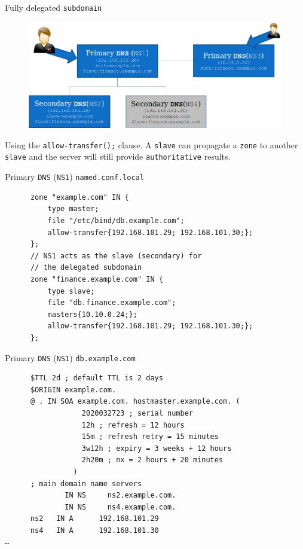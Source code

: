 \documentclass[xcolor=table,aspectratio=169]{beamer}
\begin{document}
\begin{frame}{Fully delegated \texttt{subdomain}}
  \begin{figure}
    \begin{center}
      \includegraphics[width=0.7\linewidth]{FullyDelegated2.png}
    \end{center}
  \end{figure}
  \begin{tcolorbox}
    \begin{center}
      \scriptsize Using the \texttt{allow-transfer();} clause. A \texttt{slave} can propagate a \texttt{zone} to another \texttt{slave} and the server will still provide \texttt{authoritative} results.
    \end{center}
  \end{tcolorbox}
\end{frame}

\begin{frame}[fragile]{Primary \texttt{DNS} (\texttt{NS1}) \texttt{named.conf.local}}
  \begin{tcolorbox}
    \lstset{
      basicstyle=\tiny\ttfamily,
    }
    \begin{lstlisting}
      zone "example.com" IN {
	      type master;
	      file "/etc/bind/db.example.com";
	      allow-transfer{192.168.101.29; 192.168.101.30;};
      };
      // NS1 acts as the slave (secondary) for 
      // the delegated subdomain
      zone "finance.example.com" IN {
	      type slave;
	      file "db.finance.example.com";
	      masters{10.10.0.24;};
	      allow-transfer{192.168.101.29; 192.168.101.30;};
      };    
    \end{lstlisting}
  \end{tcolorbox}
\end{frame}

\begin{frame}[fragile]{Primary \texttt{DNS} (\texttt{NS1}) \texttt{db.example.com}}
  \begin{tcolorbox}
    \lstset{
      basicstyle=\tiny\ttfamily,
    }
    \begin{lstlisting}
      $TTL 2d ; default TTL is 2 days
      $ORIGIN example.com.
      @ . IN SOA example.com. hostmaster.example.com. (
	              2020032723 ; serial number
	              12h ; refresh = 12 hours
	              15m ; refresh retry = 15 minutes
	              3w12h ; expiry = 3 weeks + 12 hours
	              2h20m ; nx = 2 hours + 20 minutes
                )
      ; main domain name servers
	          IN NS 	ns2.example.com.
	          IN NS 	ns4.example.com.
      ns2 	IN A 	  192.168.101.29
      ns4 	IN A 	  192.168.101.30
…
    \end{lstlisting}
  \end{tcolorbox}
\end{frame}
\end{document}
